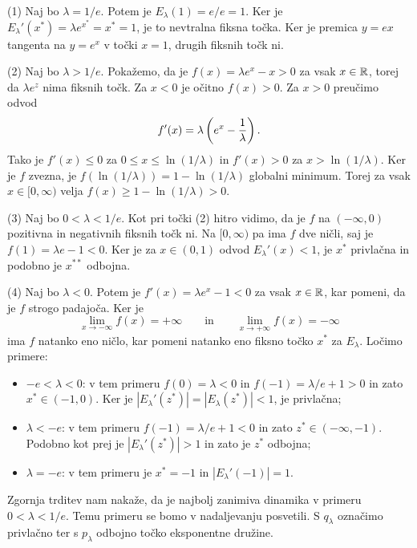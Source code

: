 \begin{dokaz}
    (1) Naj bo \(\lambda = 1/e\). Potem je \(E_\lambda (1) = e/e = 1\). Ker je \(E_\lambda' (x^*) = \lambda e^{x^*} = x^* = 1\), je to nevtralna fiksna točka. Ker je premica \(y = ex\) tangenta na \(y = e^x\) v točki \(x = 1\), drugih fiksnih točk ni.

    (2) Naj bo \(\lambda > 1/e\). Pokažemo, da je \(f (x) = \lambda e^x - x > 0\) za vsak \(x \in \mathbb R\), torej da \(\lambda e^z\) nima fiksnih točk. Za \(x < 0\) je očitno \(f (x) > 0\). Za \(x > 0\) preučimo odvod
    \[f' (x) = \lambda \left( e^x - \frac{1}{\lambda} \right).\]
    Tako je \(f' (x) \leq 0\) za \(0 \leq x \leq \ln (1 / \lambda)\) in \(f' (x) > 0\) za \(x > \ln (1 / \lambda)\). Ker je \(f\) zvezna, je \(f (\ln(1/\lambda)) = 1 - \ln (1 / \lambda)\) globalni minimum. Torej za vsak \(x \in [0, \infty)\) velja \(f (x) \geq 1 - \ln (1 / \lambda) > 0\).

    (3) Naj bo \(0 < \lambda < 1/e\). Kot pri točki (2) hitro vidimo, da je \(f\) na \((- \infty, 0)\) pozitivna in negativnih fiksnih točk ni. Na \([0, \infty)\) pa ima \(f\) dve ničli, saj je \(f (1) = \lambda e - 1 < 0\). Ker je za \(x \in (0, 1)\) odvod \(E_\lambda' (x) < 1\), je \(x^*\) privlačna in podobno je \(x^{**}\) odbojna.

    (4) Naj bo \(\lambda < 0\). Potem je \(f' (x) = \lambda e^x - 1 < 0\) za vsak \(x \in \mathbb R\), kar pomeni, da je \(f\) strogo padajoča. Ker je
    \[\lim_{x \to - \infty} f (x) = + \infty \qquad \text{in} \qquad \lim_{x \to + \infty} f (x) = - \infty\]
    ima \(f\) natanko eno ničlo, kar pomeni natanko eno fiksno točko \(x^*\) za \(E_\lambda\). Ločimo primere:
    \begin{itemize}
        \item \(-e < \lambda < 0\): v tem primeru \(f (0) = \lambda < 0\) in \(f (-1) = \lambda / e + 1 > 0\) in zato \(x^* \in (-1, 0)\). Ker je \(|E_\lambda' (z^*)| = |E_\lambda (z^*)| < 1\), je privlačna;
        \item \(\lambda < -e\): v tem primeru \(f (-1) = \lambda / e + 1 < 0\) in zato \(z^* \in (- \infty, -1)\). Podobno kot prej je \(|E_\lambda' (z^*)| > 1\) in zato je \(z^*\) odbojna;
        \item \(\lambda = - e\): v tem primeru je \(x^* = -1\) in \(|E_\lambda' (-1)| = 1\).
    \end{itemize}
\end{dokaz}

\noindent Zgornja trditev nam nakaže, da je najbolj zanimiva dinamika v primeru \(0 < \lambda < 1/e\). Temu primeru se bomo v nadaljevanju posvetili. S \(q_\lambda\) označimo privlačno ter s \(p_\lambda\) odbojno točko eksponentne družine.

